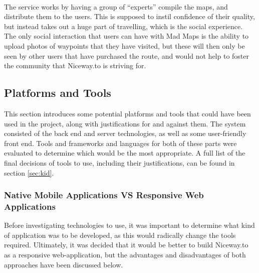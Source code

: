 \ \\
The service works by having a group of ``experts'' compile the maps, and distribute them to the users. This is supposed to instil confidence of their quality, but instead takes out a huge part of travelling, which is the social experience. The only social interaction that users can have with Mad Maps is the ability to upload photos of waypoints that they have visited, but these will then only be seen by other users that have purchased the route, and would not help to foster the community that Niceway.to is striving for. 

\newpage 
\subsection{Platforms and Tools}
\label{sec:pat}
This section introduces some potential platforms and tools that could have been used in the project, along with justifications for and against them. The system consisted of the back end and server technologies, as well as some user-friendly front end. Tools and frameworks and languages for both of these parts were evaluated to determine which would be the most appropriate. A full list of the final decisions of tools to use, including their justifications, can be found in section \ref{sec:kid}.

\subsubsection{Native Mobile Applications VS Responsive Web Applications}
Before investigating technologies to use, it was important to determine what kind of application was to be developed, as this would radically change the tools required. Ultimately, it was decided that it would be better to build Niceway.to as a responsive web-application, but the advantages and disadvantages of both approaches have been discussed below.

